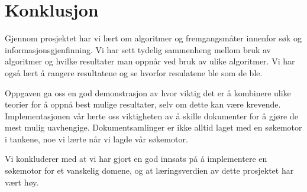 \section{Konklusjon}
\label{sec:conclusion}

Gjennom prosjektet har vi lært om algoritmer og fremgangsmåter innenfor søk og informasjonsgjenfinning. Vi har sett tydelig sammenheng mellom bruk av algoritmer og hvilke resultater man oppnår ved bruk av ulike algoritmer. Vi har også lært å rangere resultatene og se hvorfor resulatene ble som de ble. 

Oppgaven ga oss en god demonstrasjon av hvor viktig det er å kombinere ulike teorier for å oppnå best mulige resultater, selv om dette kan være krevende. Implementasjonen vår lærte oss viktigheten av å skille dokumenter for å gjøre de mest mulig uavhengige. Dokumentsamlinger er ikke alltid laget med en søkemotor i tankene, noe vi lærte når vi lagde vår søkemotor. 

Vi konkluderer med at vi har gjort en god innsats på å implementere en søkemotor for et vanskelig domene, og at læringsverdien av dette prosjektet har vært høy.
